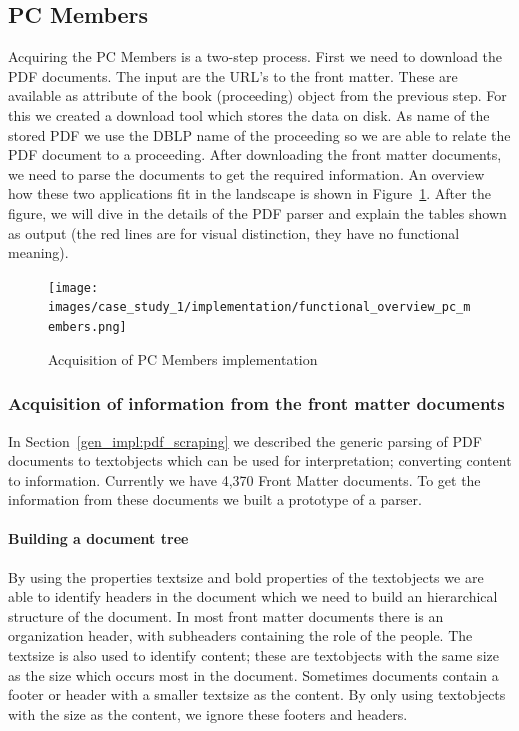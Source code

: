 \documentclass{ou-report}
\newcommand{\dblp}{DBLP}
\begin{document}
\subsection{PC Members}
\label{sec:front_matter_parsing}
Acquiring the PC Members is a two-step process. First we need to download the
PDF documents. The input are the URL's to the front matter. These are available
as attribute of the book (proceeding) object from the previous step. For this we
created a download tool which stores the data on disk. As name of the stored 
PDF we use the \dblp{} name of the proceeding so we are able to relate the PDF 
document to a proceeding.
After downloading the front matter documents, we need to parse the documents to
get the required information.
An overview how these two applications fit in the landscape is shown in
Figure~\ref{fig:functional_overview_pc_members}. After the figure, we will dive in
the details of the PDF parser and explain the tables shown as output (the red lines
are for visual distinction, they have no functional meaning).

\begin{figure}[ht]
    \centering
    \texttt{[image: images/case\_study\_1/implementation/functional\_overview\_pc\_members.png]}
    \caption{Acquisition of PC Members implementation}
    \label{fig:functional_overview_pc_members}
\end{figure}

\subsubsection{Acquisition of information from the front matter documents}
In Section~\ref{gen_impl:pdf_scraping} we described the generic parsing of PDF
documents to textobjects which can be used for interpretation; converting 
content to information. Currently we have 4,370 Front Matter documents. To get
the information from these documents we built a prototype of a parser.

\paragraph{Building a document tree}
\label{sec:lncs_parser_doc_tree}
By using the properties textsize and bold properties of the textobjects we are 
able to identify headers in the document which we need to build an hierarchical 
structure of the document. In most front matter documents there is an
organization header, with subheaders containing the role of the people.
The textsize is also used to identify content; these are textobjects with the
same size as the size which occurs most in the document. Sometimes documents
contain a footer or header with a smaller textsize as the content. By only using
textobjects with the size as the content, we ignore these footers and headers.
\end{document}
